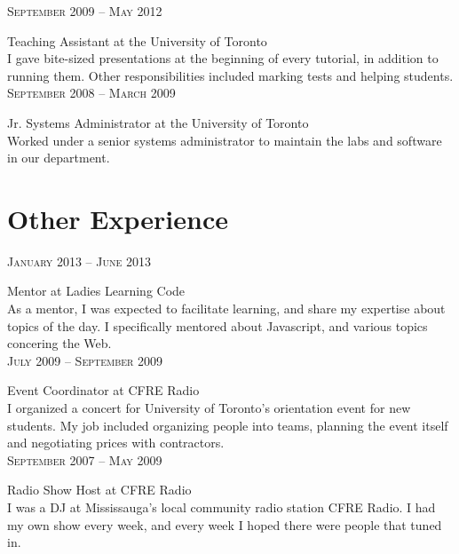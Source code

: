 \documentclass[10pt]{article}
\begin{document}
\begin{minipage}[t]{0.5\textwidth}
    \raggedleft
    \textsc{\normalsize September 2009 -- May 2012}\par

    \raggedright\large Teaching Assistant at the University of Toronto\\

    \normalsize{I gave bite-sized presentations at the beginning of every 
    tutorial, in addition to running them. Other responsibilities included
    marking tests and helping students.}\\[10pt]

    \raggedleft
    \textsc{\normalsize September 2008 -- March 2009}\par

    \raggedright\large Jr. Systems Administrator at the University of Toronto\\

    \normalsize{Worked under a senior systems administrator to maintain the
    labs and software in our department.}\\[10pt]

\section{Other Experience}
    \raggedleft
    \textsc{\normalsize January 2013 -- June 2013}\par

    \raggedright\large Mentor at Ladies Learning Code\\

    \normalsize{As a mentor, I was expected to facilitate learning, and share my
    expertise about topics of the day. I specifically mentored about Javascript,
    and various topics concering the Web.}\\[10pt]

    \raggedleft
    \textsc{\normalsize July 2009 -- September 2009}\par

    \raggedright\large Event Coordinator at CFRE Radio\\

    \normalsize{I organized a concert for University of Toronto's orientation
    event for new students. My job included organizing people into teams, 
    planning the event itself and negotiating prices with contractors.}\\[10pt]

    \raggedleft
    \textsc{\normalsize September 2007 -- May 2009}\par

    \raggedright\large Radio Show Host at CFRE Radio\\

    \normalsize{I was a DJ at Mississauga's local community radio station
    CFRE Radio. I had my own show every week, and every week I hoped there
    were people that tuned in.}\\[10pt]

\end{minipage}
\end{document}
